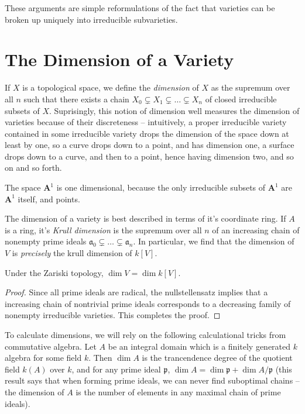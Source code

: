 These arguments are simple reformulations of the fact that varieties can be broken up uniquely into irreducible subvarieties.

\section{The Dimension of a Variety}

If $X$ is a topological space, we define the \emph{dimension} of $X$ as the supremum over all $n$ such that there exists a chain $X_0 \subsetneq X_1 \subsetneq \dots \subsetneq X_n$ of closed irreducible subsets of $X$. Suprisingly, this notion of dimension well measures the dimension of varieties because of their discreteness -- intuitively, a proper irreducible variety contained in some irreducible variety drops the dimension of the space down at least by one, so a curve drops down to a point, and has dimension one, a surface drops down to a curve, and then to a point, hence having dimension two, and so on and so forth.

\begin{example}
    The space $\mathbf{A}^1$ is one dimensional, because the only irreducible subsets of $\mathbf{A}^1$ are $\mathbf{A}^1$ itself, and points.
\end{example}

The dimension of a variety is best described in terms of it's coordinate ring. If $A$ is a ring, it's \emph{Krull dimension} is the supremum over all $n$ of an increasing chain of nonempty prime ideals $\mathfrak{a}_0 \subsetneq \dots \subsetneq \mathfrak{a}_n$. In particular, we find that the dimension of $V$ is {\it precisely} the krull dimension of $k[V]$.

\begin{theorem}
    Under the Zariski topology, $\dim V = \dim k[V]$.
\end{theorem}
\begin{proof}
    Since all prime ideals are radical, the nullstellensatz implies that a increasing chain of nontrivial prime ideals corresponds to a decreasing family of nonempty irreducible varieties. This completes the proof.
\end{proof}

To calculate dimensions, we will rely on the following calculational tricks from commutative algebra. Let $A$ be an integral domain which is a finitely generated $k$ algebra for some field $k$. Then $\dim A$ is the trancendence degree of the quotient field $k(A)$ over $k$, and for any prime ideal $\mathfrak{p}$, $\dim A = \dim \mathfrak{p} + \dim A/\mathfrak{p}$ (this result says that when forming prime ideals, we can never find suboptimal chains -- the dimension of $A$ is the number of elements in any maximal chain of prime ideals).

